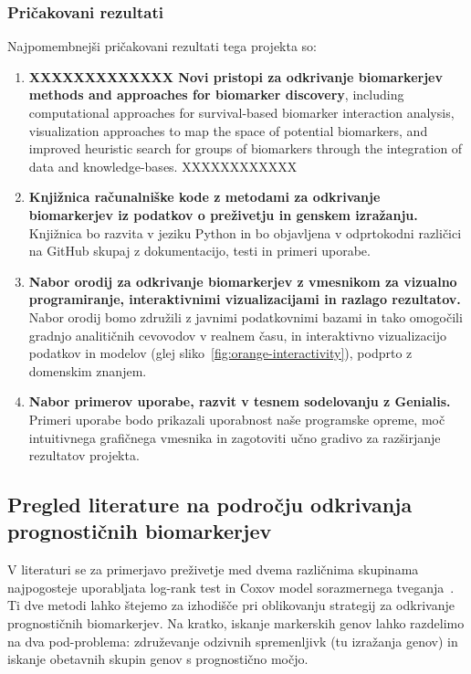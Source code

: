 \documentclass[11pt,a4paper]{article}
\renewcommand{\bold}{\textbf}
\begin{document}
\subsubsection*{Pričakovani rezultati}
Najpomembnejši pričakovani rezultati tega projekta so:
\begin{enumerate}
	\item \bold{XXXXXXXXXXXXX Novi pristopi za odkrivanje biomarkerjev methods and approaches for biomarker discovery}, including computational approaches for survival-based biomarker interaction analysis, visualization approaches to map the space of potential biomarkers, and improved heuristic search for groups of biomarkers through the integration of data and knowledge-bases. XXXXXXXXXXXX
	\item \bold{Knjižnica računalniške kode z metodami za odkrivanje biomarkerjev iz podatkov o preživetju in genskem izražanju.} Knjižnica bo razvita v jeziku Python in bo objavljena v odprtokodni različici na GitHub skupaj z dokumentacijo, testi in primeri uporabe.
	\item \bold{Nabor orodij za odkrivanje biomarkerjev z vmesnikom za vizualno programiranje, interaktivnimi vizualizacijami in razlago rezultatov.} Nabor orodij bomo združili z javnimi podatkovnimi bazami in tako omogočili gradnjo analitičnih cevovodov v realnem času, in interaktivno vizualizacijo podatkov in modelov (glej sliko~\ref{fig:orange-interactivity}), podprto z domenskim znanjem.
	\item \bold{Nabor primerov uporabe, razvit v tesnem sodelovanju z Genialis.} Primeri uporabe bodo prikazali uporabnost naše programske opreme, moč intuitivnega grafičnega vmesnika in zagotoviti učno gradivo za razširjanje rezultatov projekta.
\end{enumerate}



\subsection{Pregled literature na področju odkrivanja prognostičnih biomarkerjev}

V literaturi se za primerjavo preživetje med dvema različnima skupinama najpogosteje uporabljata log-rank test in Coxov model sorazmernega tveganja~\cite{singh2011survival}. Ti dve metodi lahko štejemo za izhodišče pri oblikovanju strategij za odkrivanje prognostičnih biomarkerjev. Na kratko, iskanje markerskih genov lahko razdelimo na dva pod-problema: združevanje odzivnih spremenljivk (tu izražanja genov) in iskanje obetavnih skupin genov s prognostično močjo.
\end{document}
